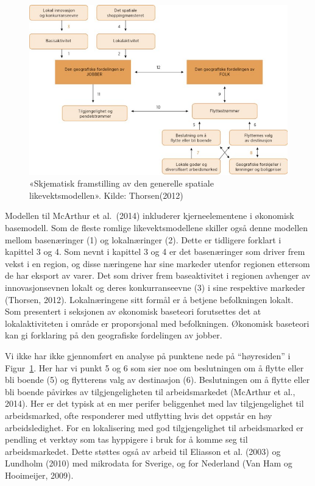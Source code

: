 \documentclass[
]{article}
\begin{document}
\begin{figure}[H]

{\centering \includegraphics{bilder/dglm.png}

}

\caption{\label{fig-thorsen}«Skjematisk framstilling av den generelle
spatiale likevektsmodellen». Kilde: Thorsen(2012)}

\end{figure}

Modellen til McArthur et al.~(2014) inkluderer kjerneelementene i
økonomisk basemodell. Som de fleste romlige likevektsmodellene skiller
også denne modellen mellom basenæringer (1) og lokalnæringer (2). Dette
er tidligere forklart i kapittel 3 og 4. Som nevnt i kapittel 3 og 4 er
det basenæringer som driver frem vekst i en region, og disse næringene
har sine markeder utenfor regionen ettersom de har eksport av varer. Det
som driver frem baseaktivitet i regionen avhenger av innovasjonsevnen
lokalt og deres konkurranseevne (3) i sine respektive markeder (Thorsen,
2012). Lokalnæringene sitt formål er å betjene befolkningen lokalt. Som
presentert i seksjonen av økonomisk baseteori forutsettes det at
lokalaktiviteten i område er proporsjonal med befolkningen. Økonomisk
baseteori kan gi forklaring på den geografiske fordelingen av jobber.

Vi ikke har ikke gjennomført en analyse på punktene nede på
``høyresiden'' i Figur~\ref{fig-thorsen}. Her har vi punkt 5 og 6 som
sier noe om beslutningen om å flytte eller bli boende (5) og flytterens
valg av destinasjon (6). Beslutningen om å flytte eller bli boende
påvirkes av tilgjengeligheten til arbeidsmarkedet (McArthur et al.,
2014). Her er det typisk at en mer perifer beliggenhet med lav
tilgjengelighet til arbeidsmarked, ofte responderer med utflytting hvis
det oppstår en høy arbeidsledighet. For en lokalisering med god
tilgjengelighet til arbeidsmarked er pendling et verktøy som tas
hyppigere i bruk for å komme seg til arbeidsmarkedet. Dette støttes også
av arbeid til Eliasson et al. (2003) og Lundholm (2010) med mikrodata
for Sverige, og for Nederland (Van Ham og Hooimeijer, 2009).
\end{document}
